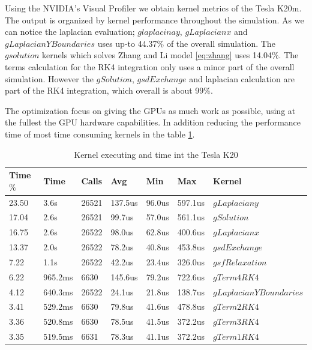 Using the NVIDIA's Visual Profiler we obtain kernel metrics of the Tesla K20m. The output is organized by kernel performance throughout the  simulation.  As we can notice the laplacian evaluation; $glaplacinay$, $gLaplacianx$ and  $gLaplacianYBoundaries$ uses up-to 44.37$\%$ of the overall simulation. The $gsolution$ kernels which solves Zhang and Li model \ref{eq:zhang} uses 14.04$\%$. The terms calculation for the RK4 integration only uses a minor part of the overall simulation. However the $gSolution$, $gsdExchange$ and laplacian calculation are part of the RK4 integration, which overall is about 99$\%$.

 The optimization focus on giving the GPUs as much work as possible, using at the fullest the GPU hardware capabilities. In addition reducing the performance time of most time consuming kernels in the table \ref{tab:nvprof}.
\begin{table}[h]
\centering
  \begin{tabular} { | l | l | l | l | l | l | l |}
    \hline
    Time$\%$& Time & Calls & Avg & Min & Max & Kernel \\
    \hline
    23.50 & 3.6s & 26521 & 137.5us & 96.0us & 597.1us&$gLaplaciany$ \\
    \hline
    17.04 & 2.6s & 26521 & 99.7us & 57.0us & 561.1us&$gSolution$ \\
    \hline
    16.75 & 2.6s & 26522 & 98.0us & 62.8us & 400.6us&$gLaplacianx$ \\
     \hline
      13.37 & 2.0s & 26522 & 78.2us & 40.8us & 453.8us&$gsdExchange$\\
      \hline
    7.22 & 1.1s & 26522 & 42.2us & 23.4us & 326.0us &$gsfRelaxation$\\
       \hline
    6.22 & 965.2ms & 6630 & 145.6us & 79.2us & 722.6us &$gTerm4RK4$\\
       \hline
    4.12 & 640.3ms & 26522 & 24.1us & 21.8us  &138.7us &$gLaplacianYBoundaries$\\
       \hline
    3.41  & 529.2ms & 6630 & 79.8us & 41.6us  & 478.8us & $gTerm2RK4$\\
       \hline
    3.36 & 520.8ms & 6630 & 78.5us & 41.5us & 372.2us & $gTerm3RK4$\\
       \hline
    3.35 & 519.5ms & 6631 & 78.3us & 41.1us & 372.2us & $gTerm1RK4$ \\
   \hline
  \end{tabular}
  \caption{Kernel executing and time int the Tesla K20}
  \label{tab:nvprof}
  \end{table}
 
